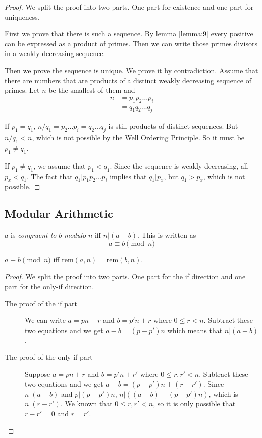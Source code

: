 \documentclass[11pt]{article}
\newcommand{\rem}{\mathrm{rem}}
\begin{document}
\begin{proof}
We split the proof into two parts. One part for existence and one part for uniqueness.

First we prove that there is such a sequence. By lemma \ref{lemma:9} every positive can be
expressed as a product of primes. Then we can write those primes divisors in a weakly
decreasing sequence.

Then we prove the sequence is unique. We prove it by contradiction. Assume that there are numbers that are products of a distinct weakly decreasing sequence of primes. Let $n$ be
the smallest of them and
\begin{align*}
n &= p_1p_2 \dots p_i \\
&= q_1q_2 \dots q_j
\end{align*}

If $p_1 = q_1$, $n/q_1 = p_2 \dots p_i = q_2 \dots q_j$ is still products of distinct
sequences. But $n/q_1 < n$, which is not possible by the Well Ordering Principle. So it must
be $p_1 \neq q_1$.

If $p_1 \neq q_1$, we assume that $p_1 < q_1$. Since the sequence is weakly decreasing, all
$p_x < q_1$. The fact that $q_1|p_1p_2 \dots p_i$ implies that $q_1|p_x$, but $q_1 > p_x$,
which is not possible.

\end{proof}

\subsection{Modular Arithmetic}

\begin{definition}
$a$ is \emph{congruent to} $b$ \emph{modulo} $n$ iff $n|(a-b)$. This is written as
$$
a \equiv b \pmod{n}
$$
\end{definition}

\begin{lemma} \label{lemma:12}
$a \equiv b \pmod{n}$ iff $\rem(a, n) = \rem(b,n)$.
\end{lemma}

\begin{proof}
We split the proof into two parts. One part for the if direction and one part for the
only-if direction.

\begin{description}
\item[The proof of the if part] We can write $a = pn + r$ and $b = p'n + r$ where
$0 \leq r < n$. Subtract these two equations and we get $a - b = (p - p')n$ which means
that $n|(a-b)$.
\item[The proof of the only-if part] Suppose $a=pn+r$ and $b=p'n+r'$ where
$0 \leq r,r' < n$. Subtract these two equations and we get $a-b=(p-p')n+(r-r')$. Since
$n|(a-b)$ and $p|(p-p')n$, $n|((a-b)-(p-p')n)$, which is $n|(r-r')$. We known that
$0 \leq r,r' < n$, so it is only possible that $r-r'=0$ and $r=r'$.
\end{description}
\end{proof}
\end{document}

